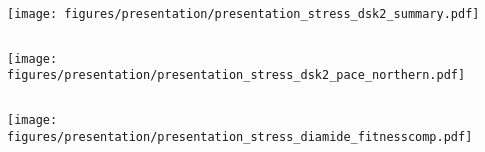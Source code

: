 \documentclass[aspectratio=169]{beamer}
\begin{document}
\begin{frame}[t]
    \texttt{[image: figures/presentation/presentation\_stress\_dsk2\_summary.pdf]}
\end{frame}

\begin{frame}
    \begin{columns}
        \begin{column}{0.5\textwidth}
            \texttt{[image: figures/presentation/presentation\_stress\_dsk2\_pace\_northern.pdf]}
        \end{column}
        \begin{column}{0.5\textwidth}
        \end{column}
    \end{columns}
\end{frame}

\begin{frame}
    \texttt{[image: figures/presentation/presentation\_stress\_diamide\_fitnesscomp.pdf]}
\end{frame}
\end{document}
